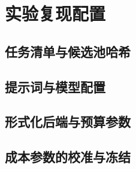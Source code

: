 \section{实验复现配置}
\mbox{}\par
\subsection{任务清单与候选池哈希}
\mbox{}\par
\subsection{提示词与模型配置}
\mbox{}\par
\subsection{形式化后端与预算参数}
\mbox{}\par
\subsection{成本参数的校准与冻结}
\mbox{}\par
